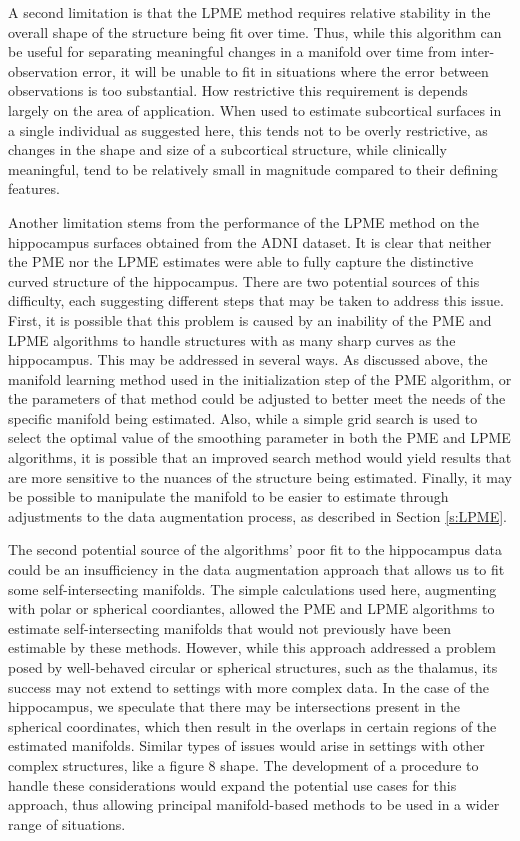 \documentclass[11pt,reqno]{article}
\theoremstyle{definition}
\begin{document}
A second limitation is that the LPME method requires relative stability in the overall shape of the structure being fit over time. Thus, while this algorithm can be useful for separating meaningful changes in a manifold over time from inter-observation error, it will be unable to fit in situations where the error between observations is too substantial. How restrictive this requirement is depends largely on the area of application. When used to estimate subcortical surfaces in a single individual as suggested here, this tends not to be overly restrictive, as changes in the shape and size of a subcortical structure, while clinically meaningful, tend to be relatively small in magnitude compared to their defining features.

Another limitation stems from the performance of the LPME method on the hippocampus surfaces obtained from the ADNI dataset. It is clear that neither the PME nor the LPME estimates were able to fully capture the distinctive curved structure of the hippocampus. There are two potential sources of this difficulty, each suggesting different steps that may be taken to address this issue. First, it is possible that this problem is caused by an inability of the PME and LPME algorithms to handle structures with as many sharp curves as the hippocampus. This may be addressed in several ways. As discussed above, the manifold learning method used in the initialization step of the PME algorithm, or the parameters of that method could be adjusted to better meet the needs of the specific manifold being estimated. Also, while a simple grid search is used to select the optimal value of the smoothing parameter in both the PME and LPME algorithms, it is possible that an improved search method would yield results that are more sensitive to the nuances of the structure being estimated. Finally, it may be possible to manipulate the manifold to be easier to estimate through adjustments to the data augmentation process, as described in Section \ref{s:LPME}.

The second potential source of the algorithms' poor fit to the hippocampus data could be an insufficiency in the data augmentation approach that allows us to fit some self-intersecting manifolds. The simple calculations used here, augmenting with polar or spherical coordiantes, allowed the PME and LPME algorithms to estimate self-intersecting manifolds that would not previously have been estimable by these methods. However, while this approach addressed a problem posed by well-behaved circular or spherical structures, such as the thalamus, its success may not extend to settings with more complex data. In the case of the hippocampus, we speculate that there may be intersections present in the spherical coordinates, which then result in the overlaps in certain regions of the estimated manifolds. Similar types of issues would arise in settings with other complex structures, like a figure 8 shape. The development of a procedure to handle these considerations would expand the potential use cases for this approach, thus allowing principal manifold-based methods to be used in a wider range of situations.
\end{document}
